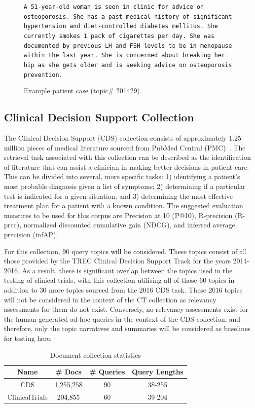 \documentclass[a4paper]{report}
\begin{document}
\begin{figure}
\small
\texttt{A 51-year-old woman is seen in clinic for advice on osteoporosis. She has a past medical history of significant hypertension and diet-controlled diabetes mellitus. She currently smokes 1 pack of cigarettes per day. She was documented by previous LH and FSH levels to be in menopause within the last year. She is concerned about breaking her hip as she gets older and is seeking advice on osteoporosis prevention.}
\caption{Example patient case  (topic\# 201429).}
\label{fig:example_topic}
\end{figure}

\subsection{Clinical Decision Support Collection}
The Clinical Decision Support (CDS) collection consists of approximately 1.25 million pieces of medical literature sourced from PubMed Central (PMC)~\citep{Roberts2015Overview-of-the}. The retrieval task associated with this collection can be described as the identification of literature that can assist a clinician in making better decisions in patient care. This can be divided into several, more specific tasks: 1) identifying a patient's most probable diagnosis given a list of symptoms; 2) determining if a particular test is indicated for a given situation; and 3) determining the most effective treatment plan for a patient with a known condition. The suggested evaluation measures to be used for this corpus are Precision at 10 (P@10), R-precision (R-prec), normalized discounted cumulative gain (NDCG), and inferred average precision (infAP).

For this collection, 90 query topics will be considered. These topics consist of all those provided by the TREC Clinical Decision Support Track for the years 2014-2016. As a result, there is significant overlap between the topics used in the testing of clinical trials, with this collection utilising all of those 60 topics in addition to 30 more topics sourced from the 2016 CDS task. These 2016 topics will not be considered in the context of the CT collection as relevancy assessments for them do not exist. Conversely, no relevancy assessments exist for the human-generated ad-hoc queries in the context of the CDS collection, and therefore, only the topic narratives and summaries will be considered as baselines for testing here.

\begin{table}
\caption{Document collection statistics}
\begin{center}
  \begin{tabular}{ | c | c | c | c | }
  	\hline
    \textbf{Name} & \textbf{\# Docs} & \textbf{\# Queries} & \textbf{Query Lengths}\\
    \hline 
    CDS & 1,255,258 & 90 & 38-255 \\
    ClinicalTrials & 204,855 & 60 & 39-204 \\
    \hline
  \end{tabular}
\end{center}
\label{collection-stats}
\end{table}
\end{document}
